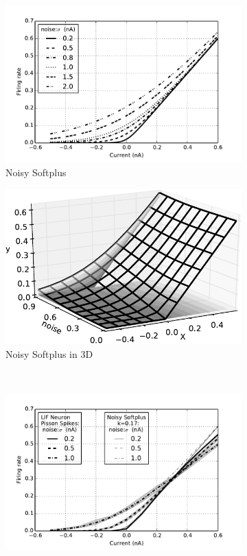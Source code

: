 	\begin{figure}[htb!]
		\centering
		\begin{subfigure}[t]{0.45\textwidth}
			\includegraphics[width=\textwidth]{pics_iconip/4.pdf}
		    \caption{Noisy Softplus}
		    \label{Fig:nsp}
		\end{subfigure}
		\begin{subfigure}[t]{0.45\textwidth}
			\includegraphics[width=\textwidth]{pics_iconip/5.pdf}
		    \caption{Noisy Softplus in 3D}
		    \label{Fig:3d}
		\end{subfigure}
		\\
		\begin{subfigure}[t]{0.45\textwidth}
			\includegraphics[width=\textwidth]{pics_iconip/4-1.pdf}

\end{subfigure}
\end{figure}
